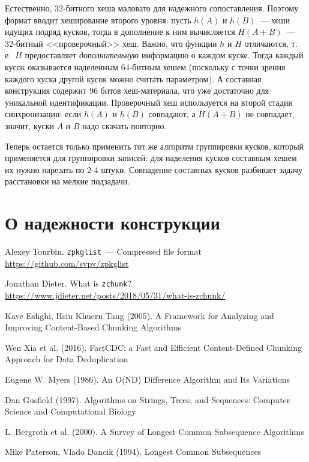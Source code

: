 \documentclass[russian,a4paper,12pt]{article}
\begin{document}
Естественно, 32-битного хеша маловато для надежного сопоставления.  Поэтому формат вводит хеширование второго уровня:
пусть $h(A)$ и $h(B)$~--- хеши идущих подряд кусков, тогда в дополнение к ним вычисляется $H(A+B)$~--- 32-битный <<проверочный>>
хеш.  Важно, что функции $h$ и $H$ отличаются, т.\,е.~$H$ предоставляет \textit{дополнительную} информацию о каждом куске.
Тогда каждый кусок оказывается наделенным 64-битным хешем (поскольку с точки зрения каждого куска другой кусок можно считать
параметром).  А составная конструкция содержит 96 битов хеш-материала, что уже достаточно для уникальной идентификации.
Проверочный хеш используется на второй стадии синхронизации: если $h(A)$ и $h(B)$ совпадают, а $H(A+B)$ не совпадает, значит,
куски $A$ и $B$ надо скачать повторно.

Теперь остается только применить тот же алгоритм группировки кусков, который применяется для группировки записей:
для наделения кусков составным хешем их нужно нарезать по 2-4 штуки.  Совпадение составных кусков разбивает задачу
расстановки на мелкие подзадачи.

\section{О надежности конструкции}

\begin{thebibliography}{9}

Alexey Tourbin. \verb|zpkglist|~--- Compressed file format\\
\url{https://github.com/svpv/zpkglist}

Jonathan Dieter. What is \verb|zchunk|?\\
\url{https://www.jdieter.net/posts/2018/05/31/what-is-zchunk/}

Kave Eshghi, Hsiu Khuern Tang (2005).
A Framework for Analyzing and Improving Content-Based Chunking Algorithms

Wen Xia et al. (2016).
FastCDC: a Fast and Efficient Content-Defined Chunking Approach for Data Deduplication

Eugene W. Myers (1986).  An O(ND) Difference Algorithm and Its Variations

Dan Gusfield (1997).  Algorithms on Strings, Trees, and Sequences:
Computer Science and Computational Biology

L. Bergroth et al. (2000).  A Survey of Longest Common Subsequence Algorithms

Mike Paterson, Vlado Dancik (1994).  Longest Common Subsequences

\end{thebibliography}
\end{document}
